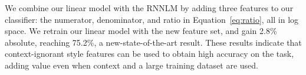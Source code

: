 \documentclass[11pt,a4paper]{article}
\newcommand{\com}[1]{}
\newcommand{\resolved}[1]{}
\newcommand{\shortv}[1]{}
\newcommand{\roy}[1]{{\color{orange}\textsc{[#1 --rs]}}}
\newcommand{\nascomment}[1]{{\color{blue}\textsc{[#1 --nas]}}}
\renewcommand{\roy}[1]{{\color{orange}[#1 --rs]}}
\renewcommand{\roy}[1]{#1}
\renewcommand{\nascomment}[1]{}
\begin{document}
We combine our linear model with the RNNLM by adding three features to
our classifier: the numerator, denominator, and ratio in
Equation~\ref{eq:ratio}, all in log space. %
We retrain our linear  model with the new feature set, and gain 2.8\%
absolute, reaching 75.2\%\com{ (15.3\% better than the published state-of-the-art\com{ and 4.1\% better than the best unpublished} result)}\roy, a new-state-of-the-art result\shortv{  for the task}.\resolved{\roy{As now the codalab shared task table contains our numbers, I removed the references to these works, and left only the footnote earlier which says that there are higher, unpublished numbers.}}
These results indicate that context-ignorant style features can be used to obtain high
accuracy on the task, adding value even when context and a large
training dataset are used.  \resolved{\nascomment{check reframing here}}
\end{document}
